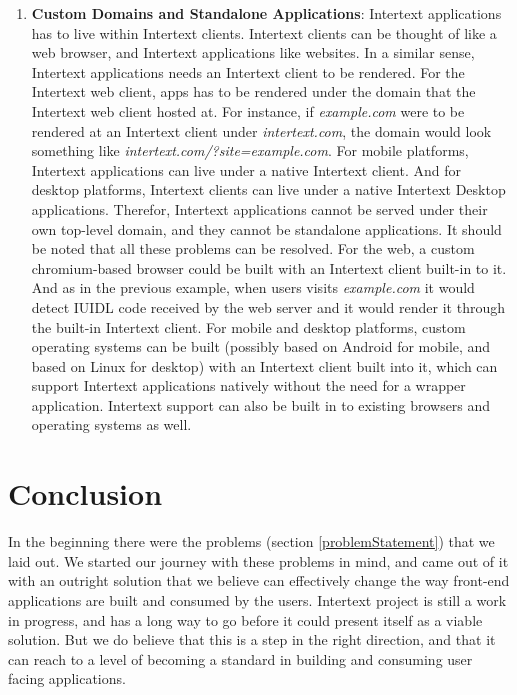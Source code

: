 \begin{enumerate}
    \item \textbf{Custom Domains and Standalone Applications}: Intertext applications has to live within Intertext clients. Intertext clients can be thought of like a web browser, and Intertext applications like websites. In a similar sense, Intertext applications needs an Intertext client to be rendered. For the Intertext web client, apps has to be rendered under the domain that the Intertext web client hosted at. For instance, if \textit{example.com} were to be rendered at an Intertext client under \textit{intertext.com}, the domain would look something like \textit{intertext.com/?site=example.com}. For mobile platforms, Intertext applications can live under a native Intertext client. And for desktop platforms, Intertext clients can live under a native Intertext Desktop applications. Therefor, Intertext applications cannot be served under their own top-level domain, and they cannot be standalone applications. It should be noted that all these problems can be resolved. For the web, a custom chromium-based browser could be built with an Intertext client built-in to it. And as in the previous example, when users visits \textit{example.com} it would detect IUIDL code received by the web server and it would render it through the built-in Intertext client. For mobile and desktop platforms, custom operating systems can be built (possibly based on Android for mobile, and based on Linux for desktop) with an Intertext client built into it, which can support Intertext applications natively without the need for a wrapper application. Intertext support can also be built in to existing browsers and operating systems as well.
    
\end{enumerate}


\chapter{Conclusion} \label{conclusion}

In the beginning there were the problems (section \ref{problemStatement}) that we laid out. We started our journey with these problems in mind, and came out of it with an outright solution that we believe can effectively change the way front-end applications are built and consumed by the users. Intertext project is still a work in progress, and has a long way to go before it could present itself as a viable solution. But we do believe that this is a step in the right direction, and that it can reach to a level of becoming a standard in building and consuming user facing applications.

